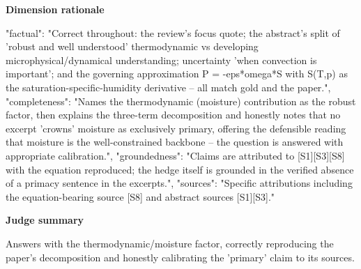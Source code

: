 \documentclass[10pt]{article}
\begin{document}
\textbf{Dimension rationale}
\begin{EvidenceText}
{
  "factual": "Correct throughout: the review's focus quote; the abstract's split of 'robust and well understood' thermodynamic vs developing microphysical/dynamical understanding; uncertainty 'when convection is important'; and the governing approximation P = -eps*omega*S with S(T,p) as the saturation-specific-humidity derivative -- all match gold and the paper.",
  "completeness": "Names the thermodynamic (moisture) contribution as the robust factor, then explains the three-term decomposition and honestly notes that no excerpt 'crowns' moisture as exclusively primary, offering the defensible reading that moisture is the well-constrained backbone -- the question is answered with appropriate calibration.",
  "groundedness": "Claims are attributed to [S1][S3][S8] with the equation reproduced; the hedge itself is grounded in the verified absence of a primacy sentence in the excerpts.",
  "sources": "Specific attributions including the equation-bearing source [S8] and abstract sources [S1][S3]."
}
\end{EvidenceText}

\textbf{Judge summary}
\begin{EvidenceText}
Answers with the thermodynamic/moisture factor, correctly reproducing the paper's decomposition and honestly calibrating the 'primary' claim to its sources.
\end{EvidenceText}
\end{document}
